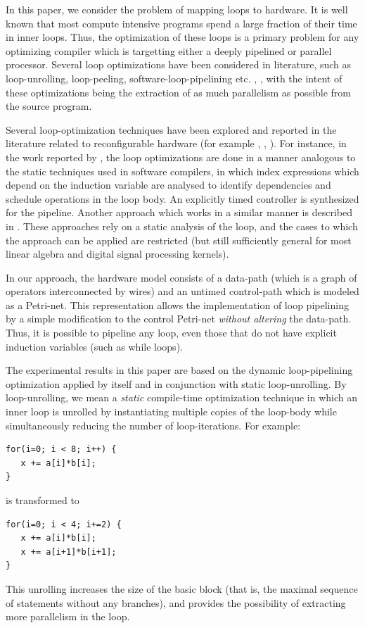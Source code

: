 \documentclass[conference]{IEEEtran}
\begin{document}
In this paper, we consider the problem of mapping loops to hardware.  It
is well known that most compute intensive programs spend a large fraction
of their time in inner loops.  Thus, the optimization of these loops is
a primary problem for any optimizing compiler which is targetting
either a deeply pipelined or parallel processor.  Several loop optimizations
have been considered in literature, such as loop-unrolling, loop-peeling,
software-loop-pipelining etc. \cite{wolfe}, \cite{muchnick}, with the intent of
these optimizations being the extraction of as much
parallelism as possible from the source program. 

Several loop-optimization techniques have been explored and
reported in the literature related to reconfigurable hardware (for
example \cite{Weinhardt}, \cite{Cardoso}, \cite{Kastner}).  For instance,
in the work reported by \cite{Weinhardt},
the loop optimizations are done in a manner analogous to the static
techniques used in software compilers, in which index 
expressions which depend on the induction variable
are analysed to identify dependencies and schedule operations
in the loop body.  An explicitly timed controller is synthesized
for the pipeline.  Another approach which works in a similar
manner is described in \cite{Cardoso}.  These approaches rely on a static analysis of
the loop, and the cases to which the approach can be applied
are restricted (but still sufficiently general for most linear
algebra and digital signal processing kernels).


In our approach, the hardware model consists of a data-path (which is
a graph of operators interconnected by wires) and an untimed control-path
which is modeled as a Petri-net.  This representation allows the implementation
of loop pipelining by a simple modification to the control Petri-net
{\em without altering} the data-path.  Thus,
it is possible to pipeline any loop, even those that do not have 
explicit induction variables (such as while loops).  


The experimental results in this paper are based on the dynamic loop-pipelining
optimization applied by itself and in conjunction with static loop-unrolling.
By loop-unrolling, we mean a {\em static} compile-time optimization technique in
which   an inner loop is unrolled by instantiating multiple copies of the loop-body
while simultaneously reducing the number of loop-iterations.  For example:
\begin{verbatim}
for(i=0; i < 8; i++) {
   x += a[i]*b[i];
}
\end{verbatim}
is transformed to
\begin{verbatim}
for(i=0; i < 4; i+=2) {
   x += a[i]*b[i];
   x += a[i+1]*b[i+1];
}
\end{verbatim}
This unrolling increases the size of the basic block (that is, the maximal sequence of
statements without any branches), and provides the possibility of extracting more
parallelism in the loop.
\end{document}

